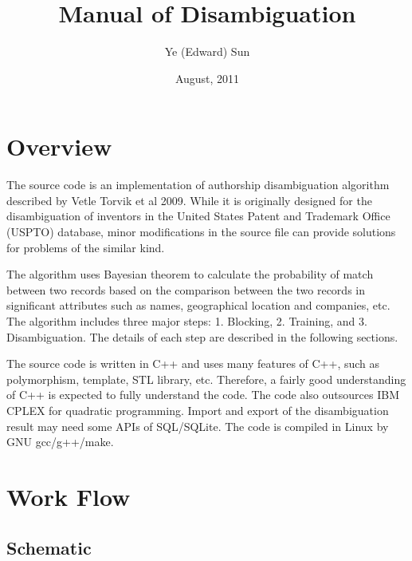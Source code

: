 \documentclass{article}
\begin{document}
\title{Manual of Disambiguation}
\author{Ye (Edward) Sun}
\date{August, 2011}
\maketitle

\section{Overview}

The source code is an implementation of authorship
disambiguation algorithm described by Vetle
Torvik et al 2009. While it is originally designed
for the disambiguation of inventors in the United
States Patent and Trademark Office (USPTO) database,
minor modifications in the source file can
provide solutions for problems of the similar kind.

The algorithm uses Bayesian theorem to calculate the
probability of match between two records based
on the comparison between the two records in significant
attributes such as names, geographical location and companies,
etc. The algorithm includes three major steps: 1. Blocking,
2. Training, and 3. Disambiguation.  The details of each
step are described in the following sections.

The source code is written in C++ and uses many features
of C++, such as polymorphism, template, STL library, etc.
Therefore, a fairly good understanding of C++ is expected
to fully understand the code. The code also outsources
IBM CPLEX for quadratic programming. Import and export of the
disambiguation result may need some APIs of SQL/SQLite.
The code is compiled in Linux by GNU gcc/g++/make.


\section{Work Flow}

\subsection{Schematic}
\end{document}
